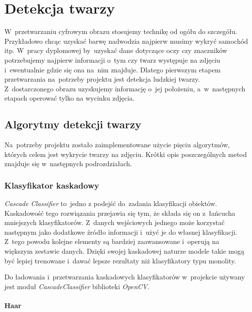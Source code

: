 \newpage

\section{Detekcja twarzy} \label{section:face_detection}

W~przetwarzaniu cyfrowym obrazu stosujemy technikę od ogółu do szczegółu. Przykładowo chcąc uzyskać barwę nadwodzia najpierw musimy wykryć samochód itp. W~pracy dyplomowej by~uzyskać dane dotyczące oczy czy znaczników potrzebujemy najpierw informacji o~tym czy twarz występuje na zdjęciu i~ewentualnie gdzie się ona na~nim znajduje. Dlatego pierwszym etapem przetwarzania na~potrzeby projektu jest detekcja ludzkiej twarzy. Z~dostarczonego obrazu uzyskujemy informację o~jej położeniu, a~w~następnych etapach operować tylko na wycinku zdjęcia. 

\subsection{Algorytmy detekcji twarzy}

Na~potrzeby projektu zostało zaimplementowane użycie pięciu algorytmów, których celem jest wykrycie twarzy na zdjęciu. Krótki opis poszczególnych metod znajduje się w~następnych podrozdziałach.

\subsubsection{Klasyfikator kaskadowy} \label{section:face_casacde_classifier}
\textit{Cascade Classifier} to~jedno z podejść do~zadania klasyfikacji obiektów. Kaskadowość tego rozwiązania przejawia się tym, że składa się on z~łańcucha mniejszych klasyfikatorów. Z~danych wejściowych jednego może korzystać następnym jako dodatkowe źródło informacji i~użyć je do własnej klasyfikacji. Z~tego powodu kolejne elementy są bardziej zaawansowane i~operują na większym zestawie danych. Dzięki swojej kaskadowej naturze modele takie mogą być lepiej trenowane i~dawać lepsze rezultaty niż klasyfikatory typu monolity.

\vspace{5mm}

Do ładowania i~przetwarzania kaskadowych klasyfikatorów w~projekcie używany jest moduł \textit{CascadeClassifier} \cite{cascade_opencv} biblioteki \textit{OpenCV}. 

\paragraph{Haar}

